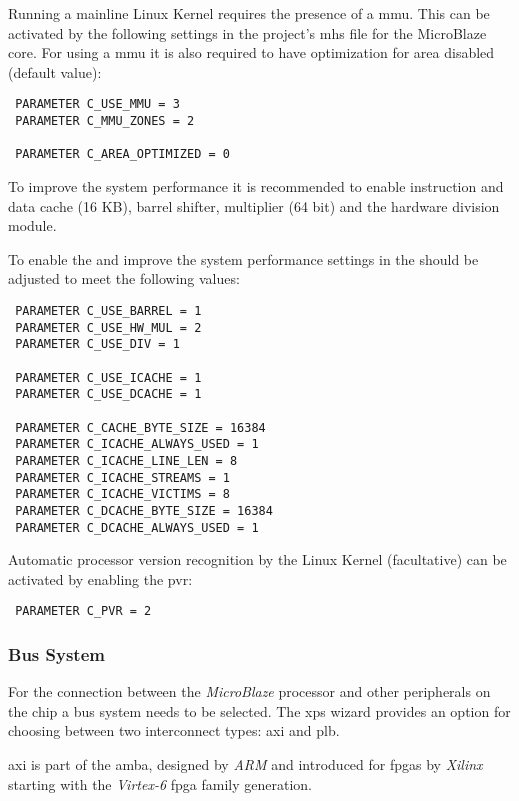 Running a mainline Linux Kernel requires the presence of a \gls{mmu}. This can be activated by the following settings in the project's \gls{mhs} file for the MicroBlaze core. For using a \gls{mmu} it is also required to have optimization for area disabled (default value):

\begin{verbatim}
 PARAMETER C_USE_MMU = 3
 PARAMETER C_MMU_ZONES = 2
 
 PARAMETER C_AREA_OPTIMIZED = 0
\end{verbatim}

To improve the system performance it is recommended to enable instruction and data cache (16 KB), barrel shifter, multiplier (64 bit) and the hardware division module.

To enable the  and improve the system performance settings  in the  should be adjusted to meet the following values:

\begin{verbatim}
 PARAMETER C_USE_BARREL = 1
 PARAMETER C_USE_HW_MUL = 2
 PARAMETER C_USE_DIV = 1

 PARAMETER C_USE_ICACHE = 1
 PARAMETER C_USE_DCACHE = 1

 PARAMETER C_CACHE_BYTE_SIZE = 16384
 PARAMETER C_ICACHE_ALWAYS_USED = 1
 PARAMETER C_ICACHE_LINE_LEN = 8
 PARAMETER C_ICACHE_STREAMS = 1
 PARAMETER C_ICACHE_VICTIMS = 8
 PARAMETER C_DCACHE_BYTE_SIZE = 16384
 PARAMETER C_DCACHE_ALWAYS_USED = 1
\end{verbatim}

Automatic processor version recognition by the Linux Kernel (facultative) can be activated by enabling the \gls{pvr}:

\begin{verbatim}
 PARAMETER C_PVR = 2
\end{verbatim}

\subsubsection{Bus System}

For the connection between the \textit{MicroBlaze} processor and other peripherals on the chip a bus system needs to be selected. The \gls{xps} wizard provides an option for choosing between two interconnect types: \gls{axi} and \gls{plb}.

\gls{axi} is part of the \gls{amba}, designed by \textit{ARM} and introduced for \gls{fpga}s by \textit{Xilinx} starting with the \textit{Virtex-6} \gls{fpga} family generation.

